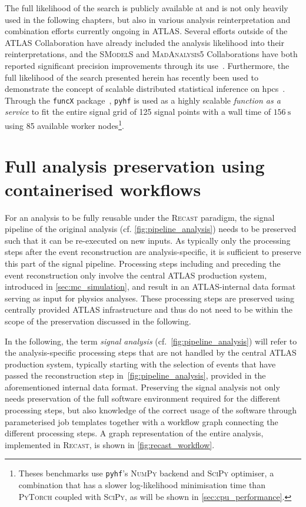 The full likelihood of the \onelepton search is publicly available at \cite{fullLH_1Lbb} and is not only heavily used in the following chapters, but also in various analysis reinterpretation and combination efforts currently ongoing in ATLAS.
Several efforts outside of the ATLAS Collaboration have already included the analysis likelihood into their reinterpretations, and the \textsc{SModelS} and \textsc{MadAnalysis5} Collaborations have both reported significant precision improvements through its use~\cite{SModelS_pyhf:2020grj,Goodsell:2020ddr,Fuks:2021wpe}. Furthermore, the full likelihood of the search presented herein has recently been used to demonstrate the concept of scalable distributed statistical inference on \glspl{hpc}~\cite{Feickert:2021sua}.
Through the \texttt{funcX} package~\cite{chard20funcx}, \texttt{pyhf} is used as a highly scalable \textit{function as a service} to fit the entire \onelepton signal grid of 125 signal points with a wall time of $\SI{156}{\second}$ using 85 available worker nodes\footnote{Theses benchmarks use \texttt{pyhf}'s \textsc{NumPy} backend and \textsc{SciPy} optimiser, a combination that has a slower log-likelihood minimisation time than \eg \textsc{PyTorch} coupled with \textsc{SciPy}, as will be shown in \cref{sec:cpu_performance}.}.

\section{Full analysis preservation using containerised workflows}\label{sec:recast_implementation}

For an analysis to be fully reusable under the \textsc{Recast} paradigm, the signal pipeline of the original analysis (cf. \cref{fig:pipeline_analysis}) needs to be preserved such that it can be re-executed on new inputs.
As typically only the processing steps after the event reconstruction are analysis-specific, it is sufficient to preserve this part of the signal pipeline.
Processing steps including and preceding the event reconstruction only involve the central ATLAS production system, introduced in \cref{sec:mc_simulation}, and result in an ATLAS-internal data format serving as input for physics analyses. These processing steps are preserved using centrally provided ATLAS infrastructure and thus do not need to be within the scope of the preservation discussed in the following.

 In the following, the term \textit{signal analysis} (cf.~\cref{fig:pipeline_analysis}) will refer to the analysis-specific processing steps that are not handled by the central ATLAS production system, typically starting with the selection of events that have passed the reconstruction step in~\cref{fig:pipeline_analysis}, provided in the aforementioned internal data format. Preserving the signal analysis not only needs preservation of the full software environment required for the different processing steps, but also knowledge of the correct usage of the software through parameterised job templates together with a workflow graph connecting the different processing steps. A graph representation of the entire analysis, implemented in \textsc{Recast}, is shown in \cref{fig:recast_workflow}.

